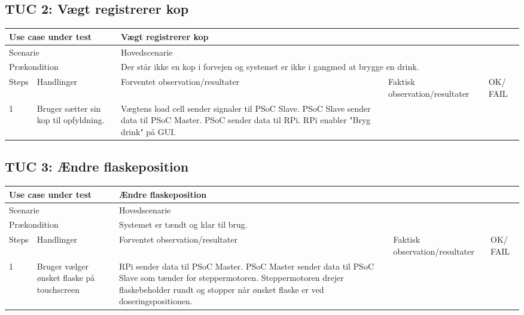 \subsection{TUC 2: Vægt registrerer kop}

\begin{table}[H]
\begin{tabular}{|p{1cm}|p{4cm}|p{4cm}|p{4cm}|p{1cm}|}
\hline
\multicolumn{2}{|p{5cm}|}{Use case under test} & \multicolumn{3}{p{9cm}|}{Vægt registrerer kop}                                       \\ \hline
\multicolumn{2}{|p{5cm}|}{Scenarie}            & \multicolumn{3}{p{9cm}|}{Hovedscenarie}                                          \\ \hline
\multicolumn{2}{|p{5cm}|}{Prækondition}        & \multicolumn{3}{p{9cm}|}{Der står ikke en kop i forvejen og systemet er ikke i gangmed at brygge en drink.}                                 \\ \hline
Steps               & Handlinger          & Forventet observation/resultater & Faktisk observation/resultater & OK/ FAIL \\ \hline
1    & Bruger sætter sin kop til opfyldning.  &  Vægtens load cell sender signaler til PSoC Slave. PSoC Slave sender data til PSoC Master. PSoC sender data til RPi. RPi enabler "Bryg drink" på GUI. &   &         \\ \hline

\end{tabular}
\end{table}

\subsection{TUC 3: Ændre flaskeposition}

\begin{table}[H]
\begin{tabular}{|p{1cm}|p{4cm}|p{4cm}|p{4cm}|p{1cm}|}
\hline
\multicolumn{2}{|p{5cm}|}{Use case under test} & \multicolumn{3}{p{9cm}|}{Ændre flaskeposition}                                       \\ \hline
\multicolumn{2}{|p{5cm}|}{Scenarie}            & \multicolumn{3}{p{9cm}|}{Hovedscenarie}                                          \\ \hline
\multicolumn{2}{|p{5cm}|}{Prækondition}        & \multicolumn{3}{p{9cm}|}{Systemet er tændt og klar til brug.}                                 \\ \hline
Steps               & Handlinger          & Forventet observation/resultater & Faktisk observation/resultater & OK/ FAIL \\ \hline
1    & Bruger vælger ønsket flaske på touchscreen  &  RPi sender data til PSoC Master. PSoC Master sender data til PSoC Slave som tænder for steppermotoren. Steppermotoren drejer flaskebeholder rundt og stopper når ønsket flaske er ved doseringspositionen. &   &         \\ \hline

\end{tabular}
\end{table}

